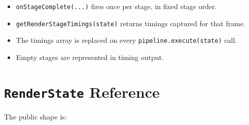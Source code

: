 \begin{itemize}
\tightlist
\item
  \texttt{o\allowbreak{}n\allowbreak{}S\allowbreak{}t\allowbreak{}a\allowbreak{}g\allowbreak{}e\allowbreak{}C\allowbreak{}o\allowbreak{}m\allowbreak{}p\allowbreak{}l\allowbreak{}e\allowbreak{}t\allowbreak{}e\allowbreak{}(\allowbreak{}.\allowbreak{}.\allowbreak{}.\allowbreak{})} fires once per stage, in fixed stage order.
\item
  \texttt{g\allowbreak{}e\allowbreak{}t\allowbreak{}R\allowbreak{}e\allowbreak{}n\allowbreak{}d\allowbreak{}e\allowbreak{}r\allowbreak{}S\allowbreak{}t\allowbreak{}a\allowbreak{}g\allowbreak{}e\allowbreak{}T\allowbreak{}i\allowbreak{}m\allowbreak{}i\allowbreak{}n\allowbreak{}g\allowbreak{}s\allowbreak{}(\allowbreak{}s\allowbreak{}t\allowbreak{}a\allowbreak{}t\allowbreak{}e\allowbreak{})} returns timings captured for that frame.
\item
  The timings array is replaced on every \texttt{p\allowbreak{}i\allowbreak{}p\allowbreak{}e\allowbreak{}l\allowbreak{}i\allowbreak{}n\allowbreak{}e\allowbreak{}.\allowbreak{}e\allowbreak{}x\allowbreak{}e\allowbreak{}c\allowbreak{}u\allowbreak{}t\allowbreak{}e\allowbreak{}(\allowbreak{}s\allowbreak{}t\allowbreak{}a\allowbreak{}t\allowbreak{}e\allowbreak{})} call.
\item
  Empty stages are represented in timing output.
\end{itemize}

\section{\texorpdfstring{\texttt{R\allowbreak{}e\allowbreak{}n\allowbreak{}d\allowbreak{}e\allowbreak{}r\allowbreak{}S\allowbreak{}t\allowbreak{}a\allowbreak{}t\allowbreak{}e} Reference}{ Reference}}\label{record-014-renderstate-reference}

The public shape is:


